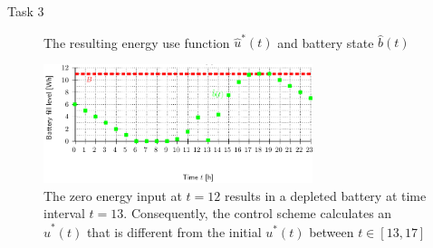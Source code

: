 \begin{frame}[allowframebreaks]{Task 3}{}
\begin{solutionnoinc}
\begin{figure}
      \caption{The resulting energy use function $\hat u^*(t)$ and battery state $\hat b(t)$}
    \end{figure}
  \end{solutionnoinc}
  \begin{solutionnoinc}
    \begin{figure}
      \centering
      \includegraphics[width=0.7\textwidth]{./figures/task5_battery.png}
      \caption{The zero energy input at $t = 12$ results in a depleted battery at time interval $t = 13$. Consequently, the control scheme calculates an $\hat u^*(t)$ that is different from the initial $u^*(t)$ between $t \in [13, 17]$}
    \end{figure}
  \end{solutionnoinc}
\end{frame}
